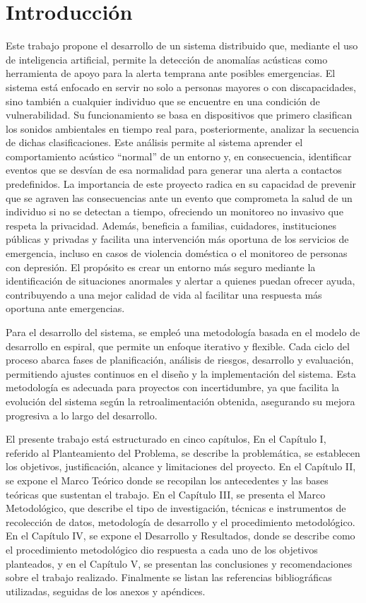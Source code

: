 \chapter*{Introducción}

Este trabajo propone el desarrollo de un sistema distribuido que, mediante el uso de inteligencia artificial, permite la detección de anomalías acústicas como herramienta de apoyo para la alerta temprana ante posibles emergencias. El sistema está enfocado en servir no solo a personas mayores o con discapacidades, sino también a cualquier individuo que se encuentre en una condición de vulnerabilidad. Su funcionamiento se basa en dispositivos que primero clasifican los sonidos ambientales en tiempo real para, posteriormente, analizar la secuencia de dichas clasificaciones. Este análisis permite al sistema aprender el comportamiento acústico ``normal'' de un entorno y, en consecuencia, identificar eventos que se desvían de esa normalidad para generar una alerta a contactos predefinidos. La importancia de este proyecto radica en su capacidad de prevenir que se agraven las consecuencias ante un evento que comprometa la salud de un individuo si no se detectan a tiempo, ofreciendo un monitoreo no invasivo que respeta la privacidad. Además, beneficia a familias, cuidadores, instituciones públicas y privadas y facilita una intervención más oportuna de los servicios de emergencia, incluso en casos de violencia doméstica o el monitoreo de personas con depresión. El propósito es crear un entorno más seguro mediante la identificación de situaciones anormales y alertar a quienes puedan ofrecer ayuda, contribuyendo a una mejor calidad de vida al facilitar una respuesta más oportuna ante emergencias.

Para el desarrollo del sistema, se empleó una metodología basada en el modelo de desarrollo en espiral, que permite un enfoque iterativo y flexible. Cada ciclo del proceso abarca fases de planificación, análisis de riesgos, desarrollo y evaluación, permitiendo ajustes continuos en el diseño y la implementación del sistema. Esta metodología es adecuada para proyectos con incertidumbre, ya que facilita la evolución del sistema según la retroalimentación obtenida, asegurando su mejora progresiva a lo largo del desarrollo.

El presente trabajo está estructurado en cinco capítulos, En el Capítulo I, referido al Planteamiento del Problema, se describe la problemática, se establecen los objetivos, justificación, alcance y limitaciones del proyecto. En el Capítulo II, se expone el Marco Teórico donde se recopilan los antecedentes y las bases teóricas que sustentan el trabajo. En el Capítulo III, se presenta el Marco Metodológico, que describe el tipo de investigación, técnicas e instrumentos de recolección de datos, metodología de desarrollo y el procedimiento metodológico. En el Capítulo IV, se expone el Desarrollo y Resultados, donde se describe como el procedimiento metodológico dio respuesta a cada uno de los objetivos planteados, y en el Capítulo V, se presentan las conclusiones y recomendaciones sobre el trabajo realizado. Finalmente se listan las referencias bibliográficas utilizadas, seguidas de los anexos y apéndices.

\clearpage
